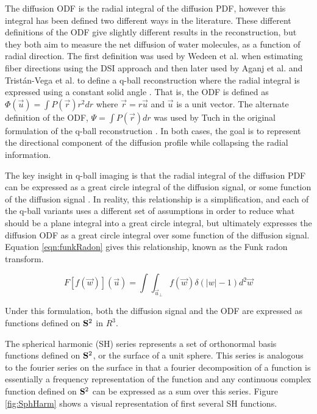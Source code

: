     The diffusion ODF is the radial integral of the diffusion PDF, however this integral has been defined two different ways in the literature. These different definitions of the ODF give slightly different results in the reconstruction, but they both aim to measure the net diffusion of water molecules, as a function of radial direction. The first definition was used by Wedeen et al. when estimating fiber directions using the DSI approach and then later used by Aganj et al. and Tristán-Vega et al. to define a q-ball reconstruction where the radial integral is expressed using a constant solid angle \cite{Aganj_2010, Trist_n_Vega_2009}. That is, the ODF is defined as $\Phi(\vec{u}) = \int{P(\vec{r})r^2dr}$ where $\vec{r} = r\vec{u}$ and $\vec{u}$ is a unit vector. The alternate definition of the ODF, $\Psi = \int{P(\vec{r})dr}$ was used by Tuch in the original formulation of the q-ball reconstruction \cite{Tuch_2004}. In both cases, the goal is to represent the directional component of the diffusion profile while collapsing the radial information.
    
    The key insight in q-ball imaging is that the radial integral of the diffusion PDF can be expressed as a great circle integral of the diffusion signal, or some function of the diffusion signal \cite{Tuch_2003, Aganj_2010}. In reality, this relationship is a simplification, and each of the q-ball variants uses a different set of assumptions in order to reduce what should be a plane integral into a great circle integral, but ultimately expresses the diffusion ODF as a great circle integral over some function of the diffusion signal. Equation \ref{eqn:funkRadon} gives this relationship, known as the Funk radon transform.

\begin{equation}
\label{eqn:funkRadon}
F[f(\vec{w})](\vec{u}) = \int\int_{\vec{u}_{\perp}}{f(\vec{w})\delta(|w|-1)d^2\vec{w}}
\end{equation}

Under this formulation, both the diffusion signal and the ODF are expressed as functions defined on $\bold{S}^2$ in $R^3$.

    The spherical harmonic (SH) series represents a set of orthonormal basis functions defined on $\bold{S}^2$, or the surface of a unit sphere. This series is analogous to the fourier series on the surface in that a fourier decomposition of a function is essentially a frequency representation of the function and any continuous complex function defined on $\bold{S}^2$ can be expressed as a sum over this series. Figure \ref{fig:SphHarm} shows a visual representation of first several SH functions.
    
    
    
   

